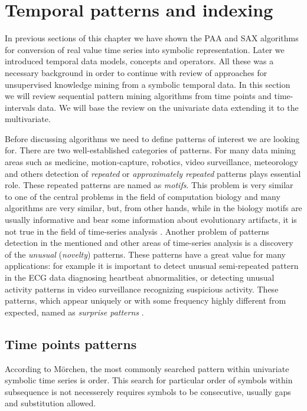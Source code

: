 \section{Temporal patterns and indexing} \label{tpatterns}
In previous sections of this chapter we have shown the PAA and SAX algorithms for conversion of real value time series into symbolic representation. Later we introduced temporal data models, concepts and operators. All these was a necessary background in order to continue with review of approaches for unsupervised knowledge mining from a symbolic temporal data. In this section we will review sequential pattern mining algorithms from time points and time-intervals data. We will base the review on the univariate data extending it to the multivariate.

Before discussing algorithms we need to define patterns of interest we are looking for. There are two well-established categories of patterns. For many data mining areas such as medicine, motion-capture, robotics, video surveillance, meteorology and others detection of \textit{repeated} or \textit{approximately repeated} patterns plays essential role. These repeated patterns are named as \textit{motifs}. This problem is very similar to one of the central problems in the field of computation biology \cite{citeulike:465665} and many algorithms are very similar, but, from other hands, while in the biology motifs are usually informative and bear some information about evolutionary artifacts, it is not true in the field of time-series analysis \cite{citeulike:3978085}. Another problem of patterns detection in the mentioned and other areas of time-series analysis is a discovery of the \textit{unusual} (\textit{novelty}) patterns. These patterns have a great value for many applications: for example it is important to detect unusual semi-repeated pattern in the ECG data diagnosing heartbeat abnormalities, or detecting unusual activity patterns in video surveillance recognizing suspicious activity. These patterns, which appear uniquely or with some frequency highly different from expected, named as \textit{surprise patterns} \cite{citeulike:3025877}.

\subsection{Time points patterns}
According to M\"orchen, the most commonly searched pattern within univariate symbolic time series is order. This search for particular order of symbols within subsequence is not necesserely requires symbols to be consecutive, usually gaps and substitution allowed. 

